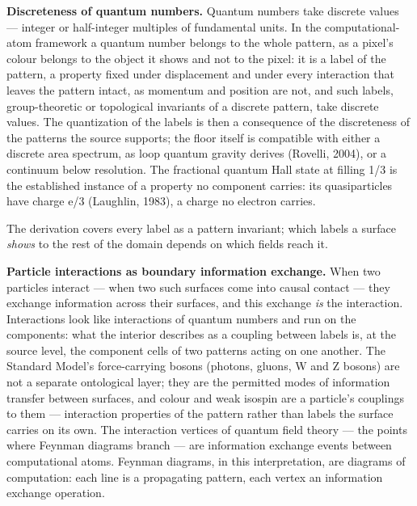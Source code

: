 \documentclass[
]{article}
\begin{document}
\textbf{Discreteness of quantum numbers.} Quantum numbers take discrete
values --- integer or half-integer multiples of fundamental units. In
the computational-atom framework a quantum number belongs to the whole
pattern, as a pixel's colour belongs to the object it shows and not to
the pixel: it is a label of the pattern, a property fixed under
displacement and under every interaction that leaves the pattern intact,
as momentum and position are not, and such labels, group-theoretic or
topological invariants of a discrete pattern, take discrete values. The
quantization of the labels is then a consequence of the discreteness of
the patterns the source supports; the floor itself is compatible with
either a discrete area spectrum, as loop quantum gravity derives
(Rovelli, 2004), or a continuum below resolution. The fractional quantum
Hall state at filling 1/3 is the established instance of a property no
component carries: its quasiparticles have charge e/3 (Laughlin, 1983),
a charge no electron carries.

The derivation covers every label as a pattern invariant; which labels a
surface \emph{shows} to the rest of the domain depends on which fields
reach it.

\textbf{Particle interactions as boundary information exchange.} When
two particles interact --- when two such surfaces come into causal
contact --- they exchange information across their surfaces, and this
exchange \emph{is} the interaction. Interactions look like interactions
of quantum numbers and run on the components: what the interior
describes as a coupling between labels is, at the source level, the
component cells of two patterns acting on one another. The Standard
Model's force-carrying bosons (photons, gluons, W and Z bosons) are not
a separate ontological layer; they are the permitted modes of
information transfer between surfaces, and colour and weak isospin are a
particle's couplings to them --- interaction properties of the pattern
rather than labels the surface carries on its own. The interaction
vertices of quantum field theory --- the points where Feynman diagrams
branch --- are information exchange events between computational atoms.
Feynman diagrams, in this interpretation, are diagrams of computation:
each line is a propagating pattern, each vertex an information exchange
operation.
\end{document}
